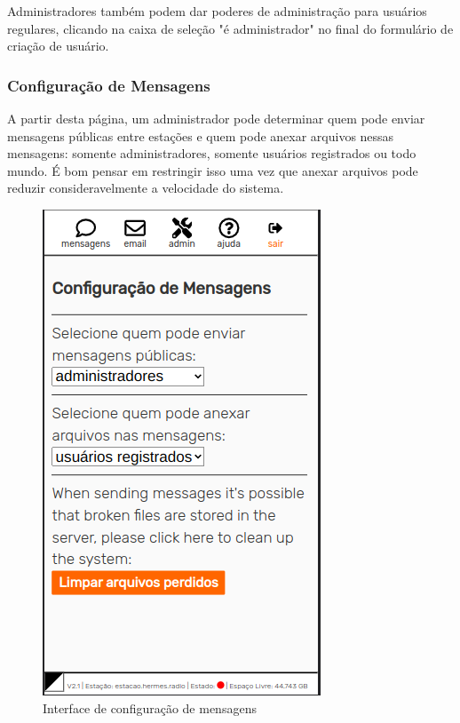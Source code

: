 \documentclass[11pt,a4paper]{article}
\begin{document}
    Administradores também podem dar poderes de administração para usuários regulares, clicando na caixa de seleção "é administrador" no final do formulário de criação de usuário.

\subsubsection{Configuração de Mensagens}  
\label{gui_msg_admin}

A partir desta página, um administrador pode determinar quem pode enviar mensagens públicas entre estações e quem pode anexar arquivos nessas mensagens: somente administradores, somente usuários registrados ou todo mundo. É bom pensar em restringir isso uma vez que anexar arquivos pode reduzir consideravelmente a velocidade do sistema.


   
    \begin{figure}[H]
    \centering
    \includegraphics[width=0.5\columnwidth]{screenshots/frontend/pt_kn/messageadm.png}
    \caption{Interface de configuração de mensagens}
    \label{fig:messageadm}
   
    \end{figure}
\end{document}
